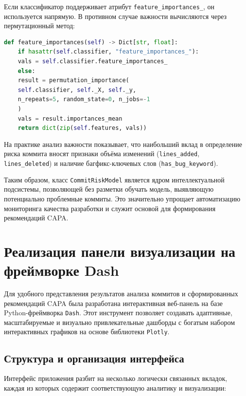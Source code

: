 Если классификатор поддерживает атрибут \texttt{feature\_importances\_}, он используется напрямую. В противном случае важности вычисляются через пермутационный метод:

\begin{lstlisting}[language=Python, caption={Вычисление важности признаков}]
	def feature_importances(self) -> Dict[str, float]:
	if hasattr(self.classifier, "feature_importances_"):
	vals = self.classifier.feature_importances_
	else:
	result = permutation_importance(
	self.classifier, self._X, self._y,
	n_repeats=5, random_state=0, n_jobs=-1
	)
	vals = result.importances_mean
	return dict(zip(self.features, vals))
\end{lstlisting}

На практике анализ важности показывает, что наибольший вклад в определение риска коммита вносят признаки объёма изменений (\texttt{lines\_added}, \texttt{lines\_deleted}) и наличие багфикс-ключевых слов (\texttt{has\_bug\_keyword}).


Таким образом, класс \texttt{CommitRiskModel} является ядром интеллектуальной подсистемы, позволяющей без разметки обучать модель, выявляющую потенциально проблемные коммиты. Это значительно упрощает автоматизацию мониторинга качества разработки и служит основой для формирования рекомендаций CAPA.

\section{Реализация панели визуализации на фреймворке Dash} \label{ch3:sec4}

Для удобного представления результатов анализа коммитов и сформированных рекомендаций CAPA была разработана интерактивная веб-панель на базе Python-фреймворка \texttt{Dash}. Этот инструмент позволяет создавать адаптивные, масштабируемые и визуально привлекательные дашборды с богатым набором интерактивных графиков на основе библиотеки \texttt{Plotly}.

\subsection{Структура и организация интерфейса}

Интерфейс приложения разбит на несколько логически связанных вкладок, каждая из которых содержит соответствующую аналитику и визуализации:

